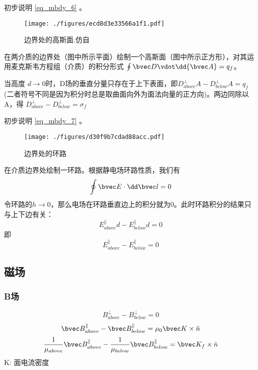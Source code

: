 \begin{example}{}
初步说明 \autoref{eq_mbdy_6} 。
\begin{figure}[ht]
\centering
\texttt{[image: ./figures/ecd8d3e33566a1f1.pdf]}
\caption{边界处的高斯面.仿自\cite{GriffE}} \label{fig_mbdy_1}
\end{figure}
在两介质的边界处（图中所示平面）绘制一个高斯面（图中所示正方形），对其运用麦克斯韦方程组（介质）的积分形式 $\oint \bvec D \vdot \dd{\bvec A} = q_f$。

当高度 $d\rightarrow0$时，D场的垂直分量只存在于上下表面，即$D^\perp_{above} A- D^\perp_{below} A= q_f$ (二者符号不同是因为积分时总是取曲面向外为面法向量的正方向)。两边同除以A，得 $D^\perp_{above} - D^\perp_{below} = \sigma_f$
\end{example}

\begin{example}{}
初步说明 \autoref{eq_mbdy_7} 。
\begin{figure}[ht]
\centering
\texttt{[image: ./figures/d30f9b7cdad88acc.pdf]}
\caption{边界处的环路} \label{fig_mbdy_3}
\end{figure}

在介质边界处绘制一环路。根据静电场环路性质，我们有
$$ \oint \bvec E \cdot \dd \bvec l = 0$$
令环路的$h\to0$，那么电场在环路垂直边上的积分就为$0$。此时环路积分的结果只与上下边有关：
$$ E_{above}^\parallel d-E_{below}^\parallel d = 0$$
即
$$ E_{above}^\parallel-E_{below}^\parallel = 0$$

\end{example}

\subsection{磁场}

\subsubsection{B场}
\begin{equation}
B^\perp_{above} - B^\perp_{below} = 0
\end{equation}
\begin{equation}
\bvec B^\parallel_{above} - \bvec B^\parallel_{below} = \mu_0\bvec K \times \hat n 
\end{equation}
\begin{equation}\label{eq_mbdy_2}
\frac{1}{\mu_{above}}\bvec B^\parallel_{above} - \frac{1}{\mu_{below}} \bvec B^\parallel_{below} = \bvec K_f \times \hat n 
\end{equation}
K: 面电流密度

